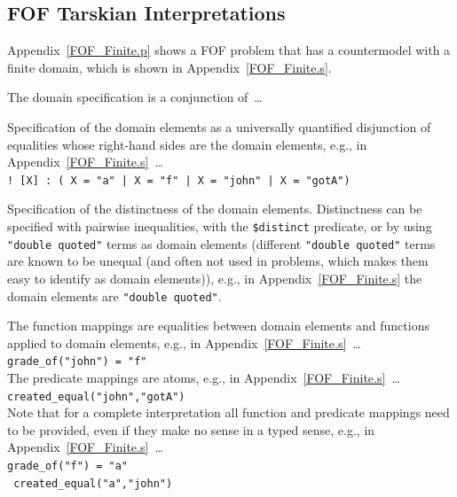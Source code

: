 \documentclass{easychair}
\newcommand{\smalltt}[1]{\small \texttt{#1}}
\newenvironment{packed_itemize}{
\vspace*{-0.3em}
\begin{itemize}
\setlength{\partopsep}{0pt}
\setlength{\itemsep}{1pt}
\setlength{\parskip}{0pt}
\setlength{\parsep}{0pt}
}{\end{itemize}}
\begin{document}
\subsection{FOF Tarskian Interpretations}
\label{FOFTarskian}

Appendix~\ref{FOF_Finite.p} shows a FOF problem that has a countermodel with a finite domain, 
which is shown in Appendix~\ref{FOF_Finite.s}.

The domain specification is a conjunction of~\ldots
\begin{packed_itemize}
\item Specification of the domain elements as a universally quantified disjunction of equalities 
      whose right-hand sides are the domain elements, 
      e.g., in Appendix~\ref{FOF_Finite.s}~\ldots\\
      \hspace*{0.5cm}\smalltt{! [X] : ( X = "a" | X = "f" | X = "john" | X = "gotA")}
\item Specification of the distinctness of the domain elements.
      Distinctness can be specified with pairwise inequalities, with the {\tt \$distinct} 
      predicate, or by using {\tt "double quoted"} terms as domain elements (different 
      {\tt "double quoted"} terms are known to be unequal (and often not used in problems, which 
      makes them easy to identify as domain elements)),
      e.g., in Appendix~\ref{FOF_Finite.s} the domain elements are {\tt "double quoted"}.
\end{packed_itemize}

The function mappings are equalities between domain elements and functions applied to domain 
elements,
e.g., in Appendix~\ref{FOF_Finite.s}~\ldots \\
\hspace*{0.5cm}\smalltt{grade\_of("john") = "f"}\\
The predicate mappings are atoms, 
e.g., in Appendix~\ref{FOF_Finite.s}~\ldots \\
\hspace*{0.5cm}\smalltt{created\_equal("john","gotA")}\\
Note that for a complete interpretation all function and predicate mappings need to be provided,
even if they make no sense in a typed sense, e.g., in Appendix~\ref{FOF_Finite.s}~\ldots \\
\hspace*{0.5cm}\smalltt{grade\_of("f") = "a"}\\
\hspace*{0.5cm}\smalltt{{\raisebox{0.4ex}{\texttildelow}} created\_equal("a","john")}
\end{document}

